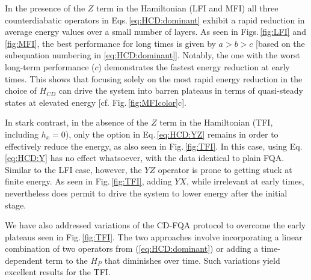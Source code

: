\documentclass[twocolumn,aps,superscriptaddress,floatfix,longbibliography]{revtex4-2}
\newcommand{\awc}[1]{{\color[rgb]{.8,.6,.6}{[AW: {\it #1}\,]}}}
\newcommand{\raj}[1]{{\color[rgb]{1,0,1}{#1}}}
\newcommand{\Eq}[1]{Eq.\,\eqref{#1}}
\newcommand{\Eqs}[1]{Eqs.\,\eqref{#1}}
\newcommand{\Fig}[1]{Fig.\,\ref{fig:#1}}
\newcommand{\Figs}[1]{Figs.\,\ref{fig:#1}}
\def\YX{\ensuremath{\mathit{YX}}\xspace} %
\def\YZ{\ensuremath{\mathit{YZ}}\xspace}
\def\XX{\ensuremath{\mathit{XX}}\xspace}
\begin{document}
In the presence of the $Z$ term in the Hamiltonian
(LFI and MFI) %
all three counterdiabatic operators in \Eqs{eq:HCD:dominant}
exhibit a rapid reduction in average energy values over a small
number of layers.
As seen in \Figs{LFI} and \ref{fig:MFI},
the best performance for long times is given by $a>b>c$
[based on the subequation numbering in \eqref{eq:HCD:dominant}].
Notably, the one with the worst long-term performance ($c$) 
demonstrates the fastest energy reduction at early times.
This shows that focusing solely on the most rapid energy reduction in the choice of $H_{CD}$
can drive the system into barren plateaus in terms of quasi-steady
states at elevated energy [cf. \Fig{MFIcolor}c].


In stark contrast, in %
the absence of the $Z$ term in the Hamiltonian (TFI,
 including $h_x=0$), only the option in \Eq{eq:HCD:YZ} remains in order to effectively reduce the energy, as also seen in \Fig{TFI}. 
In this case, using \Eq{eq:HCD:Y} has no effect
whatsoever, with the data identical to plain FQA.
Similar to the LFI case, however, the \YZ operator
is prone to getting stuck at finite energy.
As seen in \Fig{TFI},
adding \YX, while irrelevant at early times,
nevertheless does permit to drive the system to
lower energy after the initial stage. 


We have also addressed variations of the CD-FQA protocol to overcome the early plateaus seen in \Fig{TFI}. The two approaches involve incorporating a linear combination of two operators from (\ref{eq:HCD:dominant}) or adding a time-dependent term to the $H_{P}$ that diminishes over time. Such variations yield excellent results for the TFI.
\end{document}
